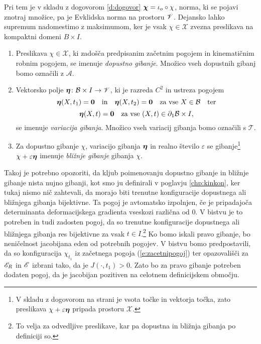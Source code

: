 Pri tem je v skladu z dogovorom \ref{d:dogovor} $\boldsymbol \chi=\iota_o\circ\chi$, norma, ki se pojavi
znotraj množice, pa je Evklidska norma na prostoru $\mathscr V$.
Dejansko lahko supremum nadomestimo z maksimumom, ker je vsak $\chi\in\mathcal{X}$
zvezna preslikava na kompaktni domeni $B\times I$.

\begin{definicija}
	\begin{enumerate}
		\item Preslikava $\chi\in\mathcal{X}$, ki zadošča predpisanim začetnim pogojem in kinematičnim robnim pogojem,
			se imenuje \emph{dopustno gibanje}. Množico vseh dopustnih gibanj bomo označili z $\mathcal{A}$.
		\item Vektorsko polje $\boldsymbol \eta\colon \mathcal B\times I\to\mathscr V$, ki je razreda $C^2$ in
			ustreza pogojem
			\[
				\boldsymbol \eta(X,t_1)=\boldsymbol 0\quad \textrm{in} \quad
				\boldsymbol \eta(X,t_2)=\boldsymbol 0\quad \textrm{za vse}\ X\in \mathcal B\quad\textrm{ter}
			\]
			\[
				\vek{\eta}(X,t)=\vek{0}\quad \textrm{za vse}\ (X,t)\in \partial_1 \B\times I,
			\]
			se imenuje \emph{variacija gibanja}. Množico vseh variacij gibanja bomo ozna\-čili s $\mathcal{T}$.
		\item Za dopustno gibanje $\chi$, variacijo gibanja $\boldsymbol \eta$ in realno število $\varepsilon$ se gibanje\footnote{
			V skladu z dogovorom na strani \pageref{seto} je vsota točke in vektorja točka, zato preslikava
			$\chi+\varepsilon\boldsymbol \eta$ pripada prostoru $\mathcal{X}$.}
			$\chi+\varepsilon\boldsymbol \eta$ imenuje \emph{bližnje gibanje} gibanja $\chi$.
	\end{enumerate}
\end{definicija}

Takoj je potrebno opozoriti, da kljub poimenovanju dopustno gibanje in bližnje gibanje nista nujno gibanji,
kot smo ju definirali v poglavju \ref{chp:kinkon}, ker tukaj nismo nič zahtevali, da morajo biti
trenutne konfiguracije dopustnega ali bližnjega gibanja bijektivne.
Ta pogoj je avtomatsko izpolnjen, če je pripadajoča determinanta deformacijskega
gradienta vseskozi različna od 0. V bistvu je to potreben in tudi zadosten pogoj, da so trenutne konfiguracije
dopustnega ali bližnjega gibanja res bijektivne za vsak $t\in I$.\footnote{
To velja za odvedljive preslikave, kar pa dopustna in bližnja gibanja po definiciji so.}
Ko bomo iskali pravo gibanje, bo neničelnost jacobijana eden od potrebnih pogojev.
V bistvu bomo predpostavili, da so konfiguracija $\chi_{t_1}$ iz začetnega pogoja (\ref{e:zacetnipogoj})
ter opazovališči za $\mathscr E_R$ in $\mathscr E$ izbrani tako, da je $J(\cdot,t_1)>0$. Zato bo za pravo gibanje
potreben dodaten pogoj, da je jacobijan pozitiven na celotnem definicijskem območju.

